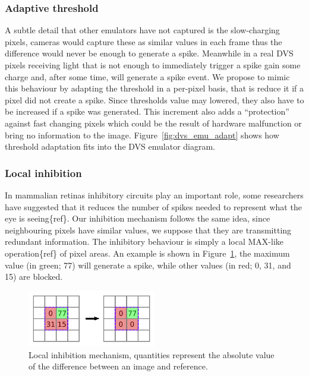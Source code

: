 \documentclass[twocolumn]{article}
\begin{document}
%

\subsubsection{Adaptive threshold} 
A subtle detail that other emulators have not captured is the slow-charging pixels, cameras would capture these as similar values in each frame thus the difference would never be enough to generate a spike. Meanwhile in a real DVS pixels receiving light that is not enough to immediately trigger a spike gain some charge and, after some time, will generate a spike event. We propose to mimic this behaviour by adapting the threshold in a per-pixel basis, that is reduce it if a pixel did not create a spike. Since thresholds value may lowered, they also have to be increased if a spike was generated. This increment also adds a ``protection'' against fast changing pixels which could be the result of hardware malfunction or bring no information to the image. Figure~\ref{fig:dvs_emu_adapt} shows how threshold adaptation fits into the DVS emulator diagram.

%


\subsubsection{Local inhibition} 
In mammalian retinas inhibitory circuits play an important role, some researchers have suggested that it reduces the number of spikes needed to represent what the eye is seeing\{ref\}. Our inhibition mechanism follows the same idea, since neighbouring pixels have similar values, we suppose that they are transmitting redundant information. The inhibitory behaviour is simply a local MAX-like operation\{ref\} of pixel areas. An example is shown in Figure~\ref{fig:local_inh}, the maximum value (in green; 77) will generate a spike, while other values (in red; 0, 31, and 15) are blocked.

\begin{figure}[htb]

  \includegraphics[width=0.5\textwidth]{inh_local_max}
  \caption{Local inhibition mechanism, quantities represent the absolute value of the difference between an image and reference.}
  \label{fig:local_inh}
\end{figure}
\end{document}
